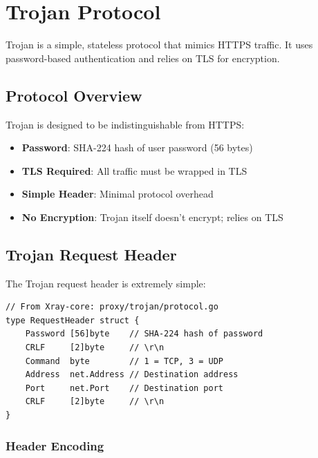 \section{Trojan Protocol}

Trojan is a simple, stateless protocol that mimics HTTPS traffic. It uses password-based authentication and relies on TLS for encryption.

\subsection{Protocol Overview}

Trojan is designed to be indistinguishable from HTTPS:
\begin{itemize}
    \item \textbf{Password}: SHA-224 hash of user password (56 bytes)
    \item \textbf{TLS Required}: All traffic must be wrapped in TLS
    \item \textbf{Simple Header}: Minimal protocol overhead
    \item \textbf{No Encryption}: Trojan itself doesn't encrypt; relies on TLS
\end{itemize}

\subsection{Trojan Request Header}

The Trojan request header is extremely simple:

\begin{verbatim}
// From Xray-core: proxy/trojan/protocol.go
type RequestHeader struct {
    Password [56]byte    // SHA-224 hash of password
    CRLF     [2]byte     // \r\n
    Command  byte        // 1 = TCP, 3 = UDP
    Address  net.Address // Destination address
    Port     net.Port    // Destination port
    CRLF     [2]byte     // \r\n
}
\end{verbatim}

\subsubsection{Header Encoding}


